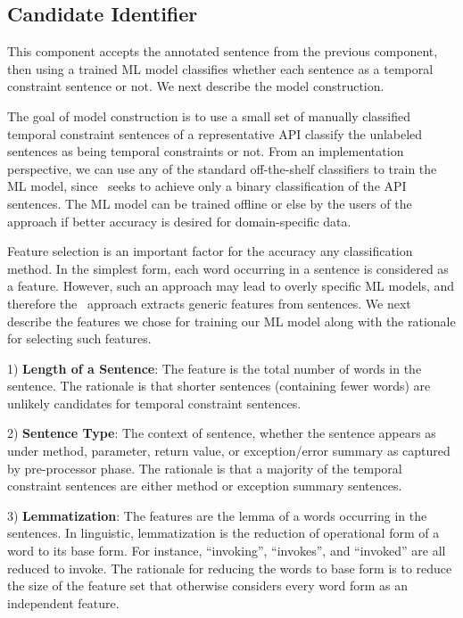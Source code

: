 \subsection{Candidate Identifier}

This component accepts the annotated sentence from the previous component,
then using a trained ML model classifies whether each sentence as a temporal constraint sentence or not. We next describe the model construction.

The goal of model construction is to use a small set of manually classified temporal constraint sentences of a representative API classify the unlabeled sentences as being temporal constraints or not.
From an implementation perspective, we can use any of the standard off-the-shelf classifiers to train the ML model, since \tool\ seeks to achieve only a binary classification of the API sentences.
The ML model can be trained offline or else by the users of the approach if better accuracy is desired for domain-specific data.

Feature selection is an important factor for the accuracy any classification method.
In the simplest form, each word occurring in a sentence is considered as a feature. However, such an approach may lead to overly specific ML models, and therefore the \tool\ approach extracts generic features from sentences. We next describe the features we chose for training our ML model along with the rationale for selecting such features.


1) \textbf{Length of a Sentence}: The feature is the total number of words in the sentence. The rationale is that shorter sentences (containing fewer words) are unlikely candidates for temporal constraint sentences. 

2) \textbf{Sentence Type}: The context of sentence, whether the sentence appears as under method, parameter, return value, or exception/error summary as captured by pre-processor phase. The rationale is that a majority of the temporal constraint sentences are either method or exception summary sentences. 
	
3) \textbf{Lemmatization}: The features are the lemma of a words occurring in the sentences. In linguistic, lemmatization is the reduction of operational form of a word to its base form. For instance, ``invoking'', ``invokes'', and ``invoked'' are all reduced to invoke. The rationale for reducing the words to base form is to reduce the size of the feature set that otherwise considers every word form as an independent feature. 
	
